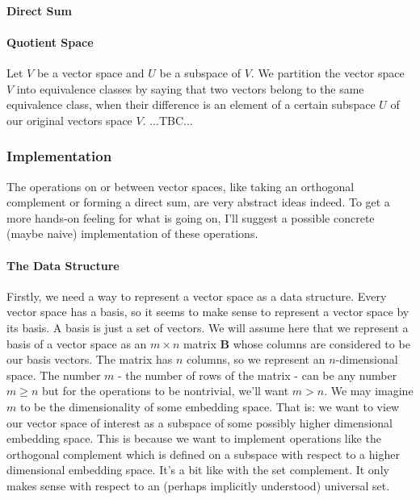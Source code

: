 \paragraph{Direct Sum}




\paragraph{Quotient Space}
Let $V$ be a vector space and $U$ be a subspace of $V$. We partition the vector space $V$ into equivalence classes by saying that two vectors belong to the same equivalence class, when their difference is an element of a certain subspace $U$ of our original vectors space $V$. ...TBC...





\subsubsection{Implementation}
The operations on or between vector spaces, like taking an orthogonal complement or forming a direct sum, are very abstract ideas indeed. To get a more hands-on feeling for what is going on, I'll suggest a possible concrete (maybe naive) implementation of these operations. 

\paragraph{The Data Structure}
Firstly, we need a way to represent a vector space as a data structure. Every vector space has a basis, so it seems to make sense to represent a vector space by its basis. A basis is just a set of vectors. We will assume here that we represent a basis of a vector space as an $m \times n$ matrix $\mathbf{B}$ whose columns are considered to be our basis vectors. The matrix has $n$ columns, so we represent an $n$-dimensional space. The number $m$ - the number of rows of the matrix - can be any number $m \geq n$ but for the operations to be nontrivial, we'll want $m > n$. We may imagine $m$ to be the dimensionality of some embedding space. That is: we want to view our vector space of interest as a subspace of some possibly higher dimensional embedding space. This is because we want to implement operations like the orthogonal complement which is defined on a subspace with respect to a higher dimensional embedding space. It's a bit like with the set complement. It only makes sense with respect to an (perhaps implicitly understood) universal set.

